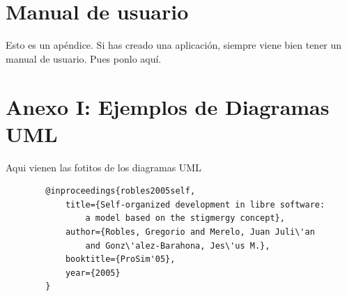 \documentclass[a4paper, 12pt]{book}
\begin{document}
\cleardoublepage
\appendix
\chapter{Manual de usuario}
\label{app:manual}

Esto es un apéndice.
Si has creado una aplicación, siempre viene bien tener un manual de usuario.
Pues ponlo aquí.

\chapter{Anexo I: Ejemplos de Diagramas UML}
Aqui vienen las fotitos de los diagramas UML 

{\footnotesize
	\begin{verbatim}
		@inproceedings{robles2005self,
			title={Self-organized development in libre software:
				a model based on the stigmergy concept},
			author={Robles, Gregorio and Merelo, Juan Juli\'an 
				and Gonz\'alez-Barahona, Jes\'us M.},
			booktitle={ProSim'05},
			year={2005}
		}
	\end{verbatim}
}


\cleardoublepage



\cleardoublepage



\end{document}
